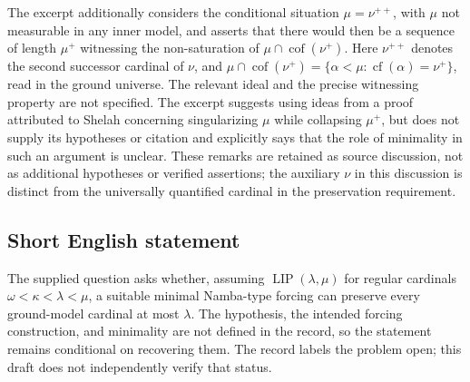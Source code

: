 \documentclass[11pt]{article}
\begin{document}
The excerpt additionally considers the conditional situation \(\mu=\nu^{++}\), with \(\mu\) not measurable in any inner model, and asserts that there would then be a sequence of length \(\mu^+\) witnessing the non-saturation of \(\mu\cap\operatorname{cof}(\nu^+)\). Here \(\nu^{++}\) denotes the second successor cardinal of \(\nu\), and \(\mu\cap\operatorname{cof}(\nu^+)=\{\alpha<\mu:\operatorname{cf}(\alpha)=\nu^+\}\), read in the ground universe. The relevant ideal and the precise witnessing property are not specified. The excerpt suggests using ideas from a proof attributed to Shelah concerning singularizing \(\mu\) while collapsing \(\mu^+\), but does not supply its hypotheses or citation and explicitly says that the role of minimality in such an argument is unclear. These remarks are retained as source discussion, not as additional hypotheses or verified assertions; the auxiliary \(\nu\) in this discussion is distinct from the universally quantified cardinal in the preservation requirement.
\subsection{Short English statement}
The supplied question asks whether, assuming \(\operatorname{LIP}(\lambda,\mu)\) for regular cardinals \(\omega<\kappa<\lambda<\mu\), a suitable minimal Namba-type forcing can preserve every ground-model cardinal at most \(\lambda\). The hypothesis, the intended forcing construction, and minimality are not defined in the record, so the statement remains conditional on recovering them. The record labels the problem open; this draft does not independently verify that status.
\end{document}
